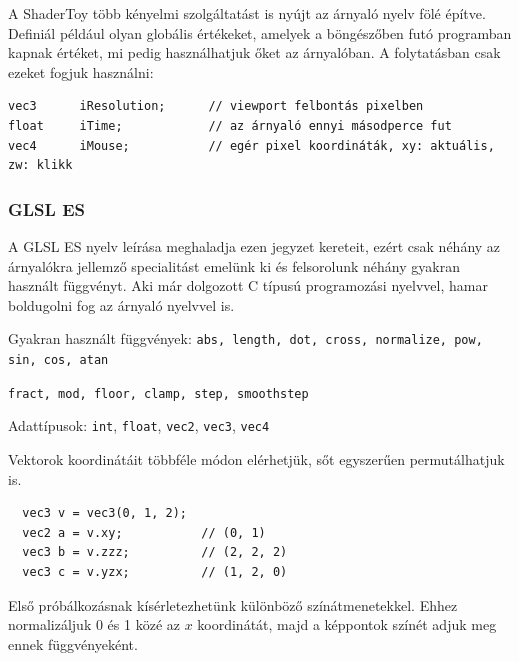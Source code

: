 A ShaderToy több kényelmi szolgáltatást is nyújt az árnyaló nyelv fölé építve. Definiál
például olyan globális értékeket, amelyek a böngészőben futó programban kapnak értéket,
mi pedig használhatjuk őket az árnyalóban. A folytatásban csak ezeket fogjuk használni:

\begin{tcolorbox}[colback=yellow!5,colframe=yellow!50!black,title=Néhány ShaderToy input változó]
\begin{verbatim}
vec3      iResolution;      // viewport felbontás pixelben
float     iTime;            // az árnyaló ennyi másodperce fut
vec4      iMouse;           // egér pixel koordináták, xy: aktuális, zw: klikk 
\end{verbatim}  
\end{tcolorbox}
  

\subsubsection{GLSL ES}

A GLSL ES nyelv leírása meghaladja ezen jegyzet kereteit, ezért csak néhány az árnyalókra jellemző
specialitást emelünk ki és felsorolunk néhány gyakran használt függvényt. Aki már dolgozott C típusú
programozási nyelvvel, hamar boldugolni fog az árnyaló nyelvvel is.

Gyakran használt függvények:
\texttt{abs, length, dot, cross, normalize, pow, sin, cos, atan}

\texttt{fract, mod, floor, clamp, step, smoothstep}

Adattípusok:
\texttt{int}, 
\texttt{float}, 
\texttt{vec2}, 
\texttt{vec3}, 
\texttt{vec4} 


Vektorok koordinátáit többféle módon elérhetjük, sőt egyszerűen permutálhatjuk is.

\begin{tcolorbox}[colback=yellow!5,colframe=yellow!50!black,title=Swizzling]
\begin{verbatim}
  vec3 v = vec3(0, 1, 2);
  vec2 a = v.xy;           // (0, 1)
  vec3 b = v.zzz;          // (2, 2, 2)
  vec3 c = v.yzx;          // (1, 2, 0)
\end{verbatim}  
\end{tcolorbox}

\matfeladatok

Első próbálkozásnak kísérletezhetünk különböző színátmenetekkel. Ehhez normalizáljuk 0 és 1 közé
az $x$ koordinátát, majd a képpontok színét adjuk meg ennek függvényeként.

